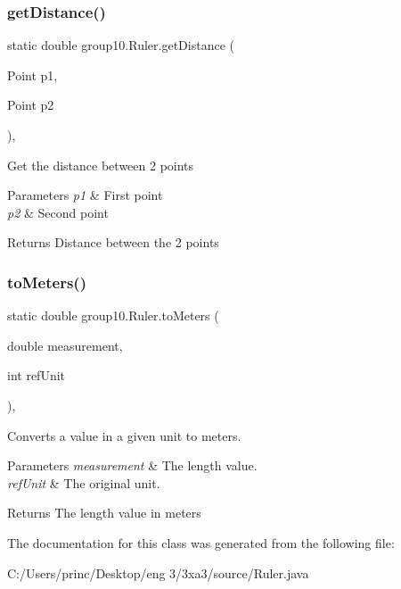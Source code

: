 \subsubsection{\texorpdfstring{get\+Distance()}{getDistance()}}
{\footnotesize\ttfamily static double group10.\+Ruler.\+get\+Distance (\begin{DoxyParamCaption}\item[{Point}]{p1,  }\item[{Point}]{p2 }\end{DoxyParamCaption})\hspace{0.3cm}{\ttfamily [static]}, {\ttfamily [private]}}

Get the distance between 2 points 
\begin{DoxyParams}{Parameters}
{\em p1} & First point \\
\hline
{\em p2} & Second point \\
\hline
\end{DoxyParams}
\begin{DoxyReturn}{Returns}
Distance between the 2 points 
\end{DoxyReturn}
\mbox{\label{classgroup10_1_1_ruler_a23c8d18380fb06f65ee8722a355baebf}} 
\subsubsection{\texorpdfstring{to\+Meters()}{toMeters()}}
{\footnotesize\ttfamily static double group10.\+Ruler.\+to\+Meters (\begin{DoxyParamCaption}\item[{double}]{measurement,  }\item[{int}]{ref\+Unit }\end{DoxyParamCaption})\hspace{0.3cm}{\ttfamily [static]}, {\ttfamily [private]}}

Converts a value in a given unit to meters. 
\begin{DoxyParams}{Parameters}
{\em measurement} & The length value. \\
\hline
{\em ref\+Unit} & The original unit. \\
\hline
\end{DoxyParams}
\begin{DoxyReturn}{Returns}
The length value in meters 
\end{DoxyReturn}


The documentation for this class was generated from the following file\+:\begin{DoxyCompactItemize}
\item 
C\+:/\+Users/princ/\+Desktop/eng 3/3xa3/source/Ruler.\+java\end{DoxyCompactItemize}
